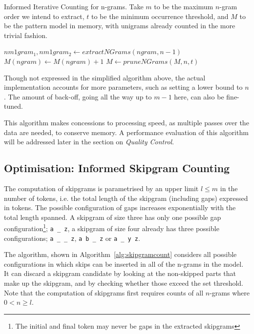 \begin{algorithm} \caption{Informed Iterative Counting for n-grams.  Take $m$
to be the maximum $n$-gram order we intend to extract, $t$ to be the minimum occurrence threshold, and $M$ to be the
pattern model in memory, with unigrams already counted in the more trivial fashion.}
\label{alg:ngramcounting}
\begin{algorithmic}
            \State  $nm1gram_1, nm1gram_2 \leftarrow extractNGrams(ngram,n-1)$
                \State $M(ngram) \leftarrow M(ngram) + 1$
            \EndIf
        \EndFor
    \EndFor
    \State $M \leftarrow pruneNGrams(M,n,t)$
\EndFor \\
\end{algorithmic}
\end{algorithm}

Though not expressed in the simplified algorithm above, the actual
implementation accounts for more parameters, such as setting a lower bound to
$n$. The amount of back-off, going all the way up to $m-1$ here, can also be
fine-tuned.

This algorithm makes concessions to processing speed, as multiple passes over
the data are needed, to conserve memory. A performance evaluation of this
algorithm will be addressed later in the section on \emph{Quality Control}.

\subsection*{Optimisation: Informed Skipgram Counting}
\label{sec:skipgramcount}

The computation of skipgrams is parametrised by an upper limit $l\leq m$ in the number of
tokens, i.e. the total length of the skipgram (including gaps) expressed in tokens. The possible configuration of gaps
increases exponentially with the total length spanned. A skipgram of size three has only one possible
gap configuration\footnote{The initial and final token may never be gaps in the extracted skipgrams};
\texttt{a \_ z}, a skipgram of size four already has three possible configurations;
\texttt{a \_ \_ z}, \texttt{a b \_ z} or \texttt{a \_ y z}.

The algorithm, shown in Algorithm~\ref{alg:skipgramcount} considers all
possible configurations in which skips can be inserted in all of the n-grams in the model. It can
discard a skipgram candidate by looking at the non-skipped parts that make up
the skipgram, and by checking whether those exceed the set threshold. Note that
the computation of skipgrams first requires counts of all $n$-grams where
$0<n\geq l$.

